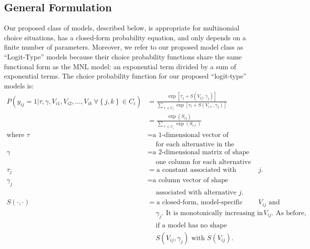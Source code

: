 \subsection{General Formulation}
\label{sec:logit_type_formulation}
Our proposed class of models, described below, is appropriate for multinomial choice situations, has a closed-form probability equation, and only depends on a finite number of parameters. Moreover, we refer to our proposed model class as ``Logit-Type'' models because their choice probability functions share the same functional form as the MNL model: an exponential term divided by a sum of exponential terms. The choice probability function for our proposed ``logit-type''  models is:
\begin{equation}
\label{eq:logit_type_models}
\begin{aligned}
P \left( y_{ij} = 1 | \tau, \gamma, V_{i1}, V_{i2}, ..., V_{ik} \ \forall \left\lbrace j, k \right\rbrace \in C_i \right) &= \frac{\exp \left[ \tau _j + S \left( V_{ij}, \gamma _j \right) \right]}{ \sum _{\ell \in C_i} \exp \left[ \tau _{\ell} + S \left( V_{i \ell}, \gamma _{\ell} \right) \right]}  \\
&= \frac{\exp \left( S_{ij} \right)}{ \sum _{\ell \in C_i} \exp \left( S_{i \ell} \right)}\\
\textrm{where } \tau &= \textrm{a 1-dimensional vector of constants, with one value}\\
&\quad \ \textrm{for each alternative in the dataset.}\\
\gamma &= \textrm{a 2-dimensional matrix of shape parameters, with}\\
&\quad \ \textrm{one column for each alternative in the dataset.}\\
\tau _j &= \textrm{a constant associated with alternative $j$.}\\
\gamma _j &= \textrm{a column vector of shape parameters}\\
&\quad \ \textrm{associated with alternative $j$.} \\
S \left( \cdot, \cdot \right) &= \textrm{a closed-form, model-specific function of $V_{ij}$ and} \\
&\quad \ \textrm{$\gamma_j$. It is monotonically increasing in $V_{ij}$. As before,} \\
&\quad \ \textrm{if a model has no shape parameters, then we replace}\\
&\quad \ \textrm{$S \left( V_{ij}, \gamma _j \right)$ with $S \left( V_{ij} \right)$.}\\
\end{aligned}
\end{equation}

